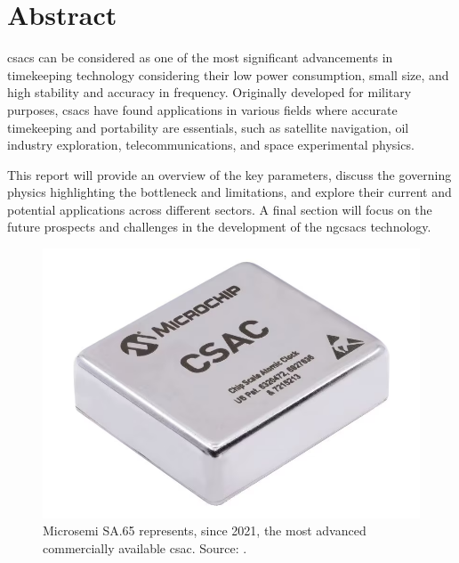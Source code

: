 \section*{Abstract}

\acrfull{csacs} can be considered as one of the most significant advancements in timekeeping technology considering their low power consumption, small size, and high stability and accuracy in frequency.
Originally developed for military purposes, \acrshort{csacs} have found applications in various fields where accurate timekeeping and portability are essentials, such as satellite navigation, oil industry exploration, telecommunications, and space experimental physics.

This report will provide an overview of the key parameters, discuss the governing physics highlighting the bottleneck and limitations, and explore their current and potential applications across different sectors.
A final section will focus on the future prospects and challenges in the development of the \acrfull{ngcsacs} technology.

\vspace{1cm}

\begin{figure}[H]
    \centering
    \includegraphics[width=.6\textwidth, max width=.8\linewidth]{img/microsemi-SA65.png}
    \caption{
        Microsemi SA.65 represents, since 2021, the most advanced commercially available \acrshort{csac}.
        Source: \cite{MICROCHIP}.
    }
    \label{fig:microsemi_SA65}
\end{figure}